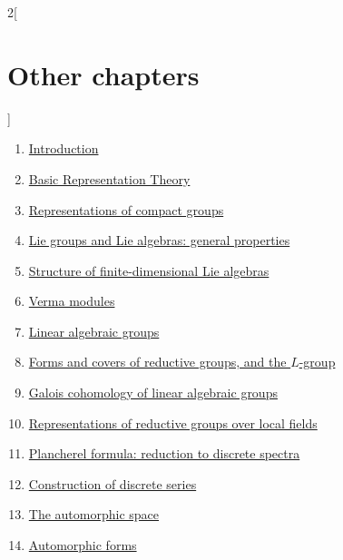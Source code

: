 \begin{multicols}{2}[\section{Other chapters}]
\noindent
\begin{enumerate}
\item \hyperref[introduction-section-phantom]{Introduction}
\item \hyperref[representationtheory-section-phantom]{Basic Representation Theory}
\item \hyperref[representations-compact-section-phantom]{Representations of compact groups}
\item \hyperref[liegroups-general-section-phantom]{Lie groups and Lie algebras: general properties}
\item \hyperref[liestructure-section-phantom]{Structure of finite-dimensional Lie algebras}
\item \hyperref[vermamodules-section-phantom]{Verma modules}
\item \hyperref[algebraicgroups-section-phantom]{Linear algebraic groups}
\item \hyperref[reductiveforms-section-phantom]{Forms and covers of reductive groups, and the $L$-group}
\item \hyperref[galoiscohomology-section-phantom]{Galois cohomology of linear algebraic groups}
\item \hyperref[representations-local-section-phantom]{Representations of reductive groups over local fields}
\item \hyperref[plancherel-section-phantom]{Plancherel formula: reduction to discrete spectra}
\item \hyperref[discreteseries-section-phantom]{Construction of discrete series}
\item \hyperref[automorphicspace-section-phantom]{The automorphic space}
\item \hyperref[automorphicforms-section-phantom]{Automorphic forms}

\end{enumerate}
\end{multicols}
